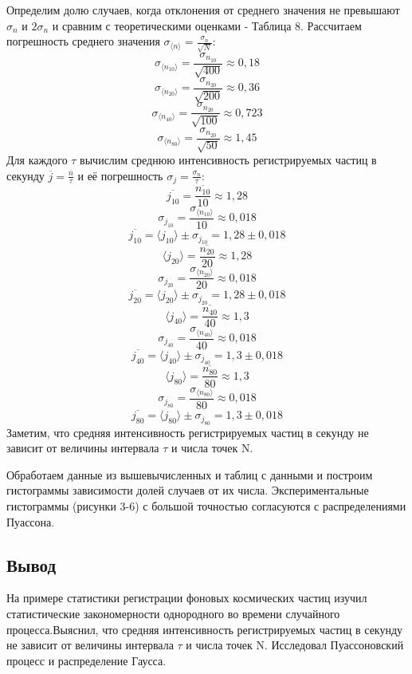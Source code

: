 \documentclass[a4paper]{article}
\begin{document}
Определим долю случаев, когда отклонения от среднего значения не превышают $\sigma_{n}$ и $2\sigma_{n}$ и сравним с теоретическими оценками - Таблица 8.
Рассчитаем погрешность среднего значения $\sigma_{\langle n \rangle} = \frac{\sigma_{n}}{\sqrt{N}}$:
\[\sigma_{\langle n_{10} \rangle} = \frac{\sigma_{n_{10}}}{\sqrt{400}} \approx 0,18\]
\[\sigma_{\langle n_{20} \rangle} = \frac{\sigma_{n_{20}}}{\sqrt{200}} \approx 0,36\]
\[\sigma_{\langle n_{40} \rangle} = \frac{\sigma_{n_{20}}}{\sqrt{100}} \approx 0,723\]
\[\sigma_{\langle n_{80} \rangle} = \frac{\sigma_{n_{20}}}{\sqrt{50}} \approx 1,45\]
Для каждого $\tau$ вычислим среднюю интенсивность регистрируемых частиц в секунду $\overline{j} = \frac{\overline{n}}{\tau}$ и её погрешность 
$\sigma_{j} = \frac{\sigma_{n}}{\tau}$:
\[\overline{j_{10}} = \frac{\overline{n_{10}}}{10} \approx 1,28\]
\[\sigma_{j_{10}} = \frac{\sigma_{\langle n_{10} \rangle}}{10} \approx 0,018\]
\[\overline{j_{10}} = \langle j_{10} \rangle \pm \sigma_{j_{10}} = 1,28 \pm 0,018 \]
\[\langle j_{20} \rangle = \frac{\overline{n_{20}}}{20} \approx 1,28\]
\[\sigma_{j_{20}} = \frac{\sigma_{\langle n_{20} \rangle}}{20} \approx 0,018\]
\[\overline{j_{20}} = \langle j_{20} \rangle \pm \sigma_{j_{20}} = 1,28 \pm 0,018 \]
\[\langle j_{40} \rangle = \frac{\overline{n_{40}}}{40} \approx 1,3\]
\[\sigma_{j_{40}} = \frac{\sigma_{\langle n_{40} \rangle}}{40} \approx 0,018\]
\[\overline{j_{40}} = \langle j_{40} \rangle \pm \sigma_{j_{40}} = 1,3 \pm 0,018 \]
\[\langle j_{80} \rangle = \frac{\overline{n_{80}}}{80} \approx 1,3\]
\[\sigma_{j_{80}} = \frac{\sigma_{\langle n_{80} \rangle}}{80} \approx 0,018\]
\[\overline{j_{80}} = \langle j_{80} \rangle \pm \sigma_{j_{80}} = 1,3 \pm 0,018 \]
Заметим, что средняя интенсивность регистрируемых частиц в секунду не зависит от величины интервала $\tau$ и числа точек N.

Обработаем данные из вышевычисленных и таблиц с данными и построим гистограммы зависимости долей случаев от их числа. Экспериментальные гистограммы (рисунки 3-6) с большой точностью согласуются с распределениями Пуассона. 


\subsection{Вывод}
На примере статистики регистрации фоновых космических частиц изучил статистические закономерности однородного во времени случайного процесса.Выяснил, что средняя интенсивность регистрируемых частиц в секунду не зависит от величины интервала $\tau$ и числа точек N. Исследовал Пуассоновский процесс и распределение Гаусса. \par
\end{document}
